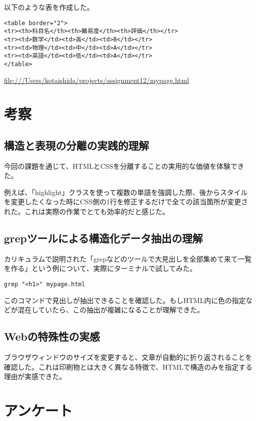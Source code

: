 \documentclass[12pt,a4j]{jarticle}
\begin{document}
以下のような表を作成した。
\begin{verbatim}
<table border="2">
<tr><th>科目名</th><th>難易度</th><th>評価</th></tr>
<tr><td>数学</td><td>高</td><td>B</td></tr>
<tr><td>物理</td><td>中</td><td>A</td></tr>
<tr><td>英語</td><td>低</td><td>A</td></tr>
</table>
\end{verbatim}


\url{file:///Users/kotaishida/projects/assignment12/mypage.html}

\section{考察}

\subsection{構造と表現の分離の実践的理解}

今回の課題を通じて、HTMLとCSSを分離することの実用的な価値を体験できた。

例えば、「highlight」クラスを使って複数の単語を強調した際、後からスタイルを変更したくなった時にCSS側の1行を修正するだけで全ての該当箇所が変更された。これは実際の作業でとても効率的だと感じた。

\subsection{grepツールによる構造化データ抽出の理解}

カリキュラムで説明された「grepなどのツールで大見出しを全部集めて来て一覧を作る」という例について、実際にターミナルで試してみた。

\begin{verbatim}
grep "<h1>" mypage.html
\end{verbatim}

このコマンドで見出しが抽出できることを確認した。もしHTML内に色の指定などが混在していたら、この抽出が複雑になることが理解できた。

\subsection{Webの特殊性の実感}

ブラウザウィンドウのサイズを変更すると、文章が自動的に折り返されることを確認した。これは印刷物とは大きく異なる特徴で、HTMLで構造のみを指定する理由が実感できた。

\section{アンケート}
\end{document}
